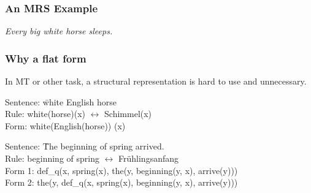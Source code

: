 \documentclass{beamer}
\begin{document}
\begin{frame}
    \frametitle{An MRS Example}

    \emph{Every big white horse sleeps.}

    \begin{center}
    \end{center}
\end{frame}

\begin{frame}
    \frametitle{Why a flat form}

    In MT or other task, a structural representation is hard to use and unnecessary.

    \begin{examples}
        \begin{tabbing}
        Sentence:   \= white English horse \\
        Rule:       \> white(horse)(x) $\leftrightarrow$ Schimmel(x) \\
        Form:  \> white(English(horse)) (x)
        \end{tabbing}
    \end{examples}

    \begin{examples}
        \begin{tabbing}
        Sentence:   \= The beginning of spring arrived. \\
        Rule:       \> beginning of spring $\leftrightarrow$ Fr{\"u}hlingsanfang \\
        Form 1:  \> def\_q(x, spring(x), the(y, beginning(y, x), arrive(y))) \\
        Form 2:  \> the(y, def\_q(x, spring(x), beginning(y, x), arrive(y))) 
        \end{tabbing}
    \end{examples}

\end{frame}
\end{document}
